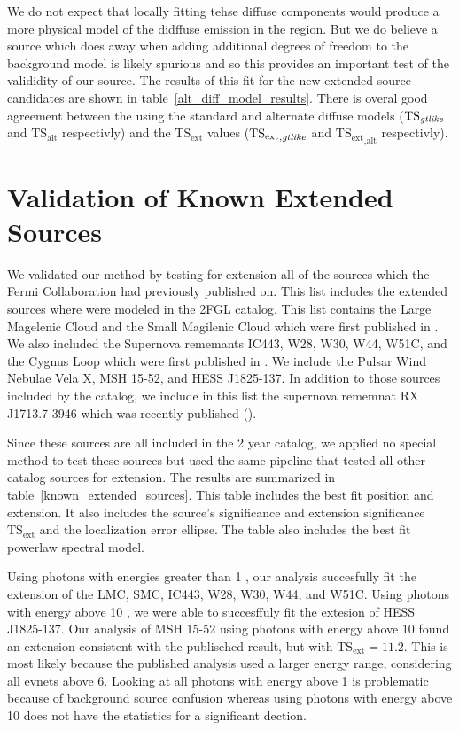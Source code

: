 \documentclass[12pt,preprint]{aastex}
\newcommand{\gev}{\text{GeV}\xspace}
\newcommand{\tsext}{{\ensuremath{\text{TS}_\text{ext}}}\xspace}
\newcommand{\tsextgtlike}{\ensuremath{\tsext_{,\gtlike}}\xspace}
\newcommand{\tsextalt}{\ensuremath{\tsext_{,\alt}}\xspace}
\newcommand{\ts}{\text{TS}\xspace}
\newcommand{\alt}{\text{alt}\xspace}
\newcommand{\gtlike}{\text{\em gtlike}\xspace}
\begin{document}
We do not expect that locally fitting tehse diffuse components would
produce a more physical model of the didffuse emission in the region.
But we do believe a source which does away when adding additional
degrees of freedom to the background model is likely spurious and so
this provides an important test of the valididity of our source.
The results of this fit for the new extended source candidates are
shown in table~\ref{alt_diff_model_results}. There is overal
good agreement between the \ts using the standard and alternate diffuse
models ($\ts_\gtlike$ and $\ts_\alt$ respectivly) and the \tsext values
(\tsextgtlike and \tsextalt respectivly).



\section{Validation of Known Extended Sources}
\label{validate_known}

We validated our method by testing for extension all of the sources
which the Fermi Collaboration had previously published on.  
This list includes the extended sources where were modeled
in the 2FGL catalog\cite{second_cat}.
This list contains the Large Magelenic Cloud and the Small Magilenic Cloud
which were first published in \cite{lmc,smc}.
We also included the Supernova rememants IC443, W28, W30,
W44, W51C, and the Cygnus Loop which were 
first published in \cite{ic443,w28,w30,w44,w51c,cygnus_loop}.
We include the Pulsar Wind Nebulae Vela X, MSH 15-52, and 
HESS J1825-137\cite{velax,msh1552,fermi_hess_j1825}.
In addition to those sources included by the catalog, we include in
this list the supernova rememnat RX J1713.7-3946 which was recently
published (\cite{RXJ1713}).

Since these sources are all included in the 2 year catalog, we applied
no special method to test these sources but used the same pipeline
that tested all other catalog sources for extension.  The results are
summarized in table~\ref{known_extended_sources}.  This table includes
the best fit position and extension. It also includes the source's
significance \ts and extension significance \tsext and the localization
error ellipse. The table also includes the best fit powerlaw spectral
model.

Using photons with energies greater than 1 \gev, our analysis succesfully
fit the extension of the LMC, SMC, IC443, W28, W30, W44, and W51C.
Using photons with energy above 10 \gev, we were able to succesffuly
fit the extesion of HESS J1825-137.
Our analysis of MSH 15-52 using photons with energy above 10 \gev found an extension
consistent with the publisehed result, but with $\tsext=11.2$. This is
most likely because the published analysis used a larger energy range,
considering all evnets above 6\gev. Looking at all photons with
energy above 1\gev 
is problematic because of background source confusion whereas using photons
with energy above 10\gev does not have the statistics for a significant dection.
\end{document}
